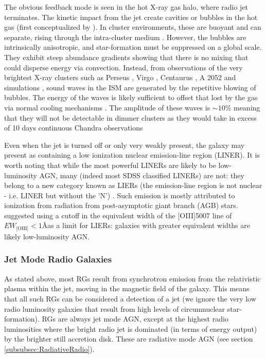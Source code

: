 			The obvious feedback mode is seen in the hot X-ray gas halo, where radio jet terminates. The kinetic impact from the jet create cavities or bubbles in the hot gas (first conceptualized by \cite{Gull1973}). In cluster environments, these are buoyant and can separate, rising through the intra-cluster medium \citep{Churazov2000, Churazov2001, McNamara2000}. However, the bubbles are intrinsically anisotropic, and star-formation must be suppressed on a global scale. They exhibit steep abundance gradients showing that there is no mixing that could disperse energy via convection. Instead, from observations of the very brightest X-ray clusters such as Perseus \citep{Fabian2003, Fabian2006}, Virgo \citep{Forman2007}, Centaurus \citep{Sanders2008}, A 2052 \citep{Blanton2011} and simulations \citep{Ruszkowski2004, Sijacki2006}, sound waves in the ISM are generated by the repetitive blowing of bubbles. The energy of the waves is likely sufficient to offset that lost by the gas via normal cooling mechanisms \citep{Fabian2003}. The amplitude of these waves is $\sim 10 \%$ meaning that they will not be detectable in dimmer clusters as they would take in excess of 10 days continuous Chandra observations \citep{Graham2008}

			Even when the jet is turned off or only very weakly present, the galaxy may present as containing a low ionization nuclear emission-line region (LINER). It is worth noting that while the most powerful LINERs are likely to be low-luminosity AGN, many (indeed most SDSS classified LINERs) are not: they belong to a new category known as LIERs (the emission-line region is not nuclear - i.e. LINER but without the 'N') \citep{Sarzi2005, Sarzi2010, Singh2013, Belfiore2016a}. Such emission is mostly attributed to ionization from radiation from post-asymptotic giant branch (AGB) stars. \citet{Capetti2011} suggested using a cutoff in the equivalent width of the [OIII]5007 line of $EW_\text{[OIII]} < 1$\AA as a limit for LIERs: galaxies with greater equivalent widths are likely low-luminosity AGN.

		\subsubsection{Jet Mode Radio Galaxies}
			\label{subsubsec:JetRadio}
			As stated above, most RGs result from synchrotron emission from the relativistic plasma within the jet, moving in the magnetic field of the galaxy. This means that all such RGs can be considered a detection of a jet (we ignore the very low radio luminosity galaxies that result from high levels of circumnuclear star-formation). RGs are always jet mode AGN, except at the highest radio luminosities where the bright radio jet is dominated (in terms of energy output) by the brighter still accretion disk. These are radiative mode AGN (see section \ref{subsubsec:RadiativeRadio}).

